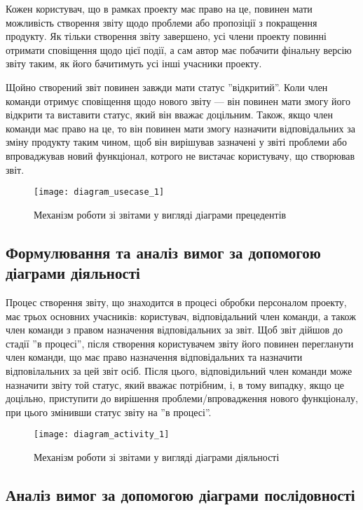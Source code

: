 \documentclass[../main.tex]{subfiles}
\begin{document}
Кожен користувач, що в рамках проекту має право на це, повинен мати можливість створення звіту щодо проблеми або пропозіції з покращення продукту. Як тільки створення звіту завершено, усі члени проекту повинні отримати сповіщення щодо цієї події, а сам автор має побачити фінальну версію звіту таким, як його бачитимуть усі інші учасники проекту.

Щойно створений звіт повинен завжди мати статус ''відкритий''. Коли член команди отримує сповіщення щодо нового звіту — він повинен мати змогу його відкрити та виставити статус, який він вважає доцільним. Також, якщо член команди має право на це, то він повинен мати змогу назначити відповідальних за зміну продукту таким чином, щоб він вирішував зазначені у звіті проблеми або впроваджував новий функціонал, котрого не вистачає користувачу, що створював звіт.

\begin{figure}[H]
\centering
\texttt{[image: diagram\_usecase\_1]}
\caption{Механізм роботи зі звітами у вигляді діаграми прецедентів}
\end{figure}

\subsection{Формулювання та аналіз вимог за допомогою діаграми діяльності}

Процес створення звіту, що знаходится в процесі обробки персоналом проекту, має трьох основних учасників: користувач, відповідальний член команди, а також член команди з правом назначення відповідальних за звіт. Щоб звіт дійшов до стадії ''в процесі'', після створення користувачем звіту його повинен перегланути член команди, що має право назначення відповідальних та назначити відповілальних за цей звіт осіб. Після цього, відповідильний член команди може назначити звіту той статус, який вважає потрібним, і, в тому випадку, якщо це доцільно, приступити до вирішення проблеми/впровадження нового функціоналу, при цього змінивши статус звіту на ''в процесі''.

\begin{figure}[H]
\centering
\texttt{[image: diagram\_activity\_1]}
\caption{Механізм роботи зі звітами у вигляді діаграми діяльності}
\end{figure}

\subsection{Аналіз вимог за допомогою діаграми послідовності}
\end{document}

